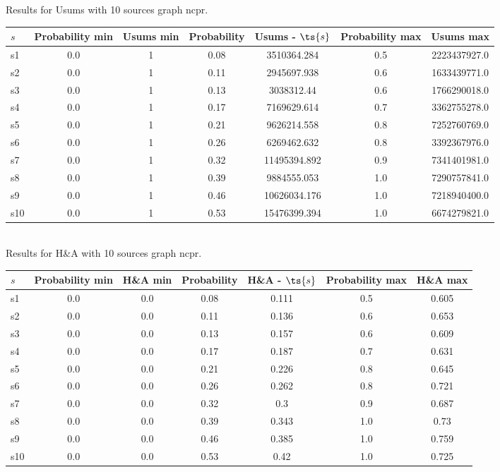 \documentclass{article}
\begin{document}
\noindent Results for Usums with 10 sources graph ncpr.

\noindent\begin{tabular}{|l|c|c|c|c|c|c|}
\hline
$s$& Probability min & Usums min & Probability & Usums - $\ts{s}$ & Probability max & Usums max\\
\hline
s1 &0.0 & 1 & 0.08 & 3510364.284 & 0.5 & 2223437927.0\\
\hline
s2 &0.0 & 1 & 0.11 & 2945697.938 & 0.6 & 1633439771.0\\
\hline
s3 &0.0 & 1 & 0.13 & 3038312.44 & 0.6 & 1766290018.0\\
\hline
s4 &0.0 & 1 & 0.17 & 7169629.614 & 0.7 & 3362755278.0\\
\hline
s5 &0.0 & 1 & 0.21 & 9626214.558 & 0.8 & 7252760769.0\\
\hline
s6 &0.0 & 1 & 0.26 & 6269462.632 & 0.8 & 3392367976.0\\
\hline
s7 &0.0 & 1 & 0.32 & 11495394.892 & 0.9 & 7341401981.0\\
\hline
s8 &0.0 & 1 & 0.39 & 9884555.053 & 1.0 & 7290757841.0\\
\hline
s9 &0.0 & 1 & 0.46 & 10626034.176 & 1.0 & 7218940400.0\\
\hline
s10 &0.0 & 1 & 0.53 & 15476399.394 & 1.0 & 6674279821.0\\
\hline
\end{tabular}\\

\noindent Results for H\&A with 10 sources graph ncpr.

\noindent\begin{tabular}{|l|c|c|c|c|c|c|}
\hline
$s$& Probability min & H\&A min & Probability & H\&A - $\ts{s}$ & Probability max & H\&A max\\
\hline
s1 &0.0 & 0.0 & 0.08 & 0.111 & 0.5 & 0.605\\
\hline
s2 &0.0 & 0.0 & 0.11 & 0.136 & 0.6 & 0.653\\
\hline
s3 &0.0 & 0.0 & 0.13 & 0.157 & 0.6 & 0.609\\
\hline
s4 &0.0 & 0.0 & 0.17 & 0.187 & 0.7 & 0.631\\
\hline
s5 &0.0 & 0.0 & 0.21 & 0.226 & 0.8 & 0.645\\
\hline
s6 &0.0 & 0.0 & 0.26 & 0.262 & 0.8 & 0.721\\
\hline
s7 &0.0 & 0.0 & 0.32 & 0.3 & 0.9 & 0.687\\
\hline
s8 &0.0 & 0.0 & 0.39 & 0.343 & 1.0 & 0.73\\
\hline
s9 &0.0 & 0.0 & 0.46 & 0.385 & 1.0 & 0.759\\
\hline
s10 &0.0 & 0.0 & 0.53 & 0.42 & 1.0 & 0.725\\
\hline
\end{tabular}\\
\end{document}
